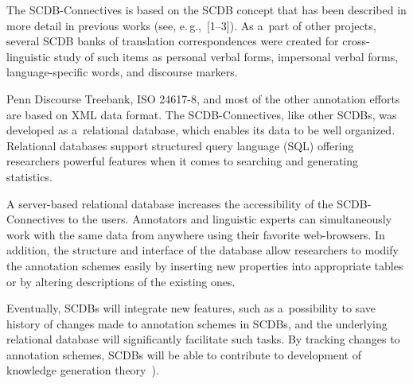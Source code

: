 \begin{multicols}{2}
  The SCDB-Connectives is based on the SCDB concept that has been described in 
more detail in previous works (see, e.\,g.,~[1--3]). As a~part of other projects, several 
SCDB banks of translation correspondences were created for cross-linguistic study of 
such items as personal verbal forms, impersonal verbal forms, language-specific 
words, and discourse markers.
  
  Penn Discourse Treebank, ISO 24617-8, and most of the other annotation efforts are based on XML 
data format. The SCDB-Connectives, like other SCDBs, was developed as 
a~relational database, which enables its data to be well organized. Relational 
databases support structured query language (SQL) offering researchers powerful features when it 
comes to searching and generating statistics. 
  
  A server-based relational database increases the accessibility of the  
SCDB-Connectives to the users. Annotators and linguistic experts can simultaneously 
work with the same data from anywhere using their favorite web-browsers. In 
addition, the structure and interface of the database allow researchers to modify the 
annotation schemes easily by inserting new properties into appropriate tables or by 
altering descriptions of the existing ones. 
{

}
  
  Eventually, SCDBs will integrate new features, such as a~possibility to save history 
of changes made to annotation schemes in SCDBs, and the underlying relational 
database will significantly facilitate such tasks. By tracking changes to annotation 
schemes, SCDBs will be able to contribute to development of knowledge generation 
theory~\cite{15-kr, 16-kr, 17-kr}). 
  

\end{multicols}
